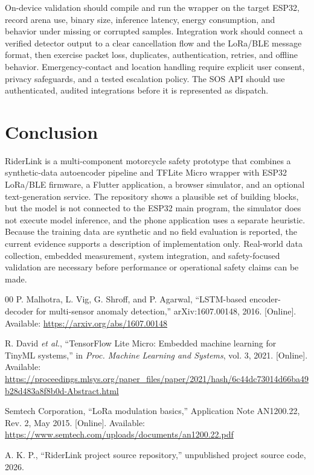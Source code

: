 \documentclass[conference]{IEEEtran}
\begin{document}
On-device validation should compile and run the wrapper on the target ESP32, record arena use, binary size, inference latency, energy consumption, and behavior under missing or corrupted samples. Integration work should connect a verified detector output to a clear cancellation flow and the LoRa/BLE message format, then exercise packet loss, duplicates, authentication, retries, and offline behavior. Emergency-contact and location handling require explicit user consent, privacy safeguards, and a tested escalation policy. The SOS API should use authenticated, audited integrations before it is represented as dispatch.

\section{Conclusion}
RiderLink is a multi-component motorcycle safety prototype that combines a synthetic-data autoencoder pipeline and TFLite Micro wrapper with ESP32 LoRa/BLE firmware, a Flutter application, a browser simulator, and an optional text-generation service. The repository shows a plausible set of building blocks, but the model is not connected to the ESP32 main program, the simulator does not execute model inference, and the phone application uses a separate heuristic. Because the training data are synthetic and no field evaluation is reported, the current evidence supports a description of implementation only. Real-world data collection, embedded measurement, system integration, and safety-focused validation are necessary before performance or operational safety claims can be made.

\begin{thebibliography}{00}
P. Malhotra, L. Vig, G. Shroff, and P. Agarwal, ``LSTM-based encoder-decoder for multi-sensor anomaly detection,'' arXiv:1607.00148, 2016. [Online]. Available: \url{https://arxiv.org/abs/1607.00148}

R. David \emph{et al.}, ``TensorFlow Lite Micro: Embedded machine learning for TinyML systems,'' in \emph{Proc. Machine Learning and Systems}, vol. 3, 2021. [Online]. Available: \url{https://proceedings.mlsys.org/paper_files/paper/2021/hash/6c44dc73014d66ba49b28d483a8f8b0d-Abstract.html}

Semtech Corporation, ``LoRa modulation basics,'' Application Note AN1200.22, Rev. 2, May 2015. [Online]. Available: \url{https://www.semtech.com/uploads/documents/an1200.22.pdf}

A. K. P., ``RiderLink project source repository,'' unpublished project source code, 2026.
\end{thebibliography}
\end{document}
